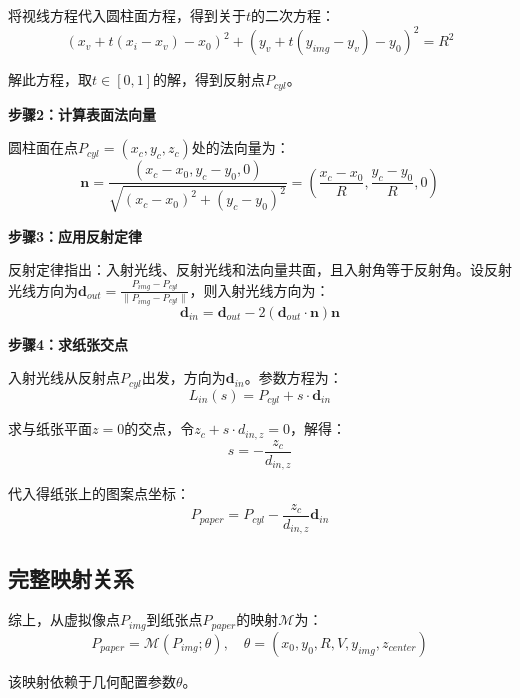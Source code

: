 \documentclass[withoutpreface]{cumcmthesis}
\begin{document}
将视线方程代入圆柱面方程，得到关于$t$的二次方程：
\begin{equation}
(x_v+t(x_i-x_v)-x_0)^2 + (y_v+t(y_{img}-y_v)-y_0)^2 = R^2
\end{equation}

解此方程，取$t\in[0,1]$的解，得到反射点$P_{cyl}$。

\textbf{步骤2：计算表面法向量}

圆柱面在点$P_{cyl}=(x_c,y_c,z_c)$处的法向量为：
\begin{equation}
\mathbf{n} = \frac{(x_c-x_0, y_c-y_0, 0)}{\sqrt{(x_c-x_0)^2+(y_c-y_0)^2}} = \left(\frac{x_c-x_0}{R}, \frac{y_c-y_0}{R}, 0\right)
\end{equation}

\textbf{步骤3：应用反射定律}

反射定律指出：入射光线、反射光线和法向量共面，且入射角等于反射角。设反射光线方向为$\mathbf{d}_{out}=\frac{P_{img}-P_{cyl}}{\|P_{img}-P_{cyl}\|}$，则入射光线方向为：
\begin{equation}
\mathbf{d}_{in} = \mathbf{d}_{out} - 2(\mathbf{d}_{out}\cdot\mathbf{n})\mathbf{n}
\end{equation}

\textbf{步骤4：求纸张交点}

入射光线从反射点$P_{cyl}$出发，方向为$\mathbf{d}_{in}$。参数方程为：
\begin{equation}
L_{in}(s) = P_{cyl} + s\cdot\mathbf{d}_{in}
\end{equation}

求与纸张平面$z=0$的交点，令$z_c+s\cdot d_{in,z}=0$，解得：
\begin{equation}
s = -\frac{z_c}{d_{in,z}}
\end{equation}

代入得纸张上的图案点坐标：
\begin{equation}
P_{paper} = P_{cyl} - \frac{z_c}{d_{in,z}}\mathbf{d}_{in}
\end{equation}

\subsection{完整映射关系}

综上，从虚拟像点$P_{img}$到纸张点$P_{paper}$的映射$\mathcal{M}$为：
\begin{equation}
P_{paper} = \mathcal{M}(P_{img}; \theta), \quad \theta=(x_0,y_0,R,V,y_{img},z_{center})
\end{equation}

该映射依赖于几何配置参数$\theta$。
\end{document}
